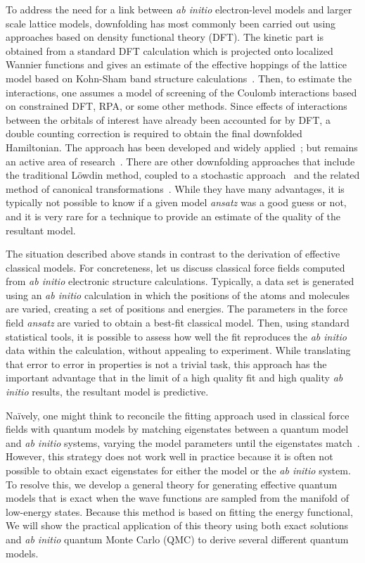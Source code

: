 To address the need for a link between {\it ab initio} electron-level models and larger scale lattice models, downfolding has most commonly been carried out using approaches based on density functional theory (DFT). 
The kinetic part is obtained from a standard DFT calculation which is projected onto localized Wannier functions and gives an estimate of the effective hoppings of the lattice model based on Kohn-Sham band structure calculations~\cite{Pavirini}. 
Then, to estimate the interactions, one assumes a model of screening of the Coulomb interactions based on constrained DFT, RPA, or some other methods. 
Since effects of interactions between the orbitals of interest have already been accounted for by DFT, a double counting correction is required to obtain the final downfolded Hamiltonian. 
The approach has been developed and widely applied~\cite{Pavirini, Dasgupta, Aryasetiawan2004, Jeschke2013}; but remains an active area of research~\cite{Haule_doublecounting}.
There are other downfolding approaches that include the traditional L\"owdin method, coupled to a stochastic approach~\cite{Tenno,Zhou_Ceperley} and the related method of canonical transformations~\cite{White_CT, Yanai_CT}. 
While they have many advantages, it is typically not possible to know if a given model {\it ansatz} was a good guess or not, and it is very rare for a technique to provide an estimate of the quality of the resultant model. 

The situation described above stands in contrast to the derivation of effective classical models. 
For concreteness, let us discuss classical force fields computed from {\it ab initio} electronic structure calculations. 
Typically, a data set is generated using an {\it ab initio} calculation in which the positions of the atoms and molecules are varied, creating a set of positions and energies. 
The parameters in the force field {\it ansatz} are varied to obtain a best-fit classical model.
Then, using standard statistical tools, it is possible to assess how well the fit reproduces the {\it ab initio} data within the calculation, without appealing to experiment. 
While translating that error to error in properties is not a trivial task, this approach has the important advantage that in the limit of a high quality fit and high quality {\it ab initio} results, the resultant model is predictive.

Na\"ively, one might think to reconcile the fitting approach used in classical force fields with quantum models by matching eigenstates between a quantum model and {\it ab initio} systems, varying the model parameters until the eigenstates match~\cite{Wagner2013}. 
However, this strategy does not work well in practice because it is often not possible to obtain exact eigenstates for either the model or the {\it ab initio} system.
To resolve this, we develop a general theory for generating effective quantum models that is exact when the wave functions are sampled from the manifold of low-energy states. 
Because this method is based on fitting the energy functional, 
We will show the practical application of this theory using both exact solutions and {\it ab initio} quantum Monte Carlo (QMC) to derive several different quantum models.


